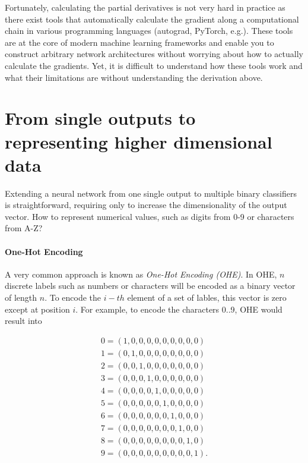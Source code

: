 Fortunately, calculating the partial derivatives is not very hard in practice as there exist tools that automatically calculate the gradient along a computational chain in various programming languages (autograd, PyTorch, e.g.). These tools are at the core of modern machine learning frameworks and enable you to construct arbitrary network architectures without worrying about how to actually calculate the gradients. Yet, it is difficult to understand how these tools work and what their limitations are without understanding the derivation above.

\section{From single outputs to representing higher dimensional data}
Extending a neural network from one single output to multiple binary classifiers is straightforward, requiring only to increase the dimensionality of the output vector. How to represent numerical values, such as digits from 0-9 or characters from A-Z?


\paragraph{One-Hot Encoding}  A very common approach is known as \textsl{One-Hot Encoding (OHE)}. In OHE, $n$ discrete labels such as numbers or characters will be encoded as a binary vector of length $n$. To encode the $i-th$ element of a set of lables, this vector is zero except at position $i$. For example, to encode the characters 0..9, OHE would result into

\begin{eqnarray}
\nonumber
0 = (1,0,0,0,0,0,0,0,0,0)\\
\nonumber
1 = (0,1,0,0,0,0,0,0,0,0)\\
\nonumber
2 = (0,0,1,0,0,0,0,0,0,0)\\
\nonumber
3 = (0,0,0,1,0,0,0,0,0,0)\\
\nonumber
4 = (0,0,0,0,1,0,0,0,0,0)\\
\nonumber
5 = (0,0,0,0,0,1,0,0,0,0)\\
\nonumber
6 = (0,0,0,0,0,0,1,0,0,0)\\
\nonumber
7 = (0,0,0,0,0,0,0,1,0,0)\\
\nonumber
8 = (0,0,0,0,0,0,0,0,1,0)\\
\nonumber
9 = (0,0,0,0,0,0,0,0,0,1).
\end{eqnarray}

